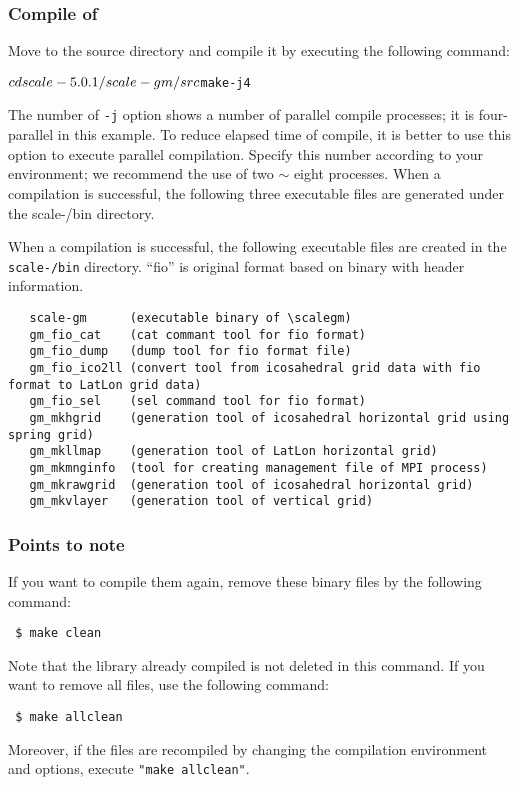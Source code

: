 \subsubsection{Compile of \scalegm} %

Move to the \scalegm source directory
and compile it by executing the following command:
\begin{alltt}
  $  cd scale-{\version}/scale-gm/src
  $  make -j 4
\end{alltt}

The number of \verb|-j| option shows a number of parallel compile processes;
it is four-parallel in this example.
To reduce elapsed time of compile,
it is better to use this option to execute parallel compilation.
Specify this number according to your environment;
we recommend the use of two $\sim$ eight processes.
When a compilation is successful,
the following three executable files are generated under the scale-{\version}/bin directory.

When a compilation is successful,
the following executable files are created in the \texttt{scale-{\version}/bin} directory.
``fio'' is original format based on binary with header information.
\begin{verbatim}
   scale-gm      (executable binary of \scalegm)
   gm_fio_cat    (cat commant tool for fio format)
   gm_fio_dump   (dump tool for fio format file)
   gm_fio_ico2ll (convert tool from icosahedral grid data with fio format to LatLon grid data)
   gm_fio_sel    (sel command tool for fio format)
   gm_mkhgrid    (generation tool of icosahedral horizontal grid using spring grid)
   gm_mkllmap    (generation tool of LatLon horizontal grid)
   gm_mkmnginfo  (tool for creating management file of MPI process)
   gm_mkrawgrid  (generation tool of icosahedral horizontal grid)
   gm_mkvlayer   (generation tool of vertical grid)
\end{verbatim}


\subsubsection{Points to note}

\noindent If you want to compile them again, remove these binary files by the following command:
\begin{verbatim}
 $ make clean
\end{verbatim}
Note that the library already compiled is not deleted in this command. If you want to remove all files, use the following command:
\begin{verbatim}
 $ make allclean
\end{verbatim}
Moreover, if the files are recompiled by changing the compilation environment and options,
execute \verb|"make allclean"|.\\


